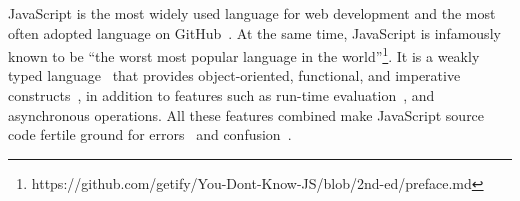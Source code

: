 
JavaScript is the most widely used language for web development and the most often adopted language on GitHub~\cite{BugsJS:ICST}. At the same time, JavaScript is infamously known to be ``the worst most popular language in the world''\footnote{https://github.com/getify/You-Dont-Know-JS/blob/2nd-ed/preface.md}. It is a weakly typed language~\cite{DynamicBehaviorJS:PLDI} that provides object-oriented, functional, and imperative constructs~\cite{JS-CodeSmells:SCAM}, in addition to features such as run-time evaluation~\cite{BugsJS:ICST,ClientSideBugsJS:TSE}, and asynchronous operations. All these 
features combined make JavaScript source code fertile ground for errors~\cite{BugsJS:ICST,ClientSideBugsJS:TSE} and confusion~\cite{JSGoodParts:book}.

